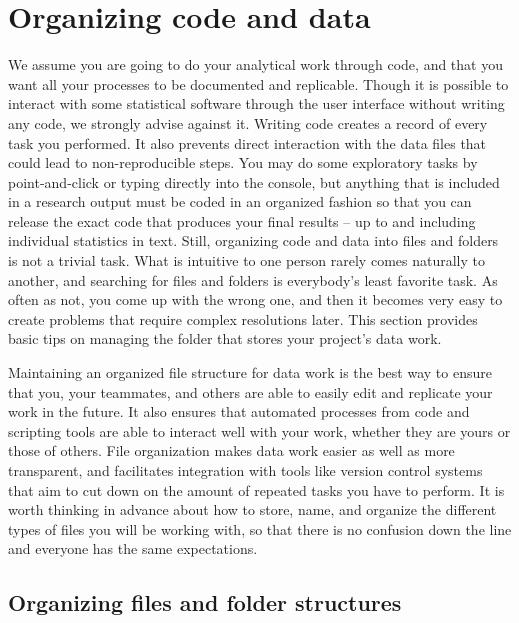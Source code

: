 \section{Organizing code and data}

We assume you are going to do your analytical work through code,
and that you want all your processes to be documented and replicable.
Though it is possible to interact with some statistical software
through the user interface without writing any code,
we strongly advise against it.
Writing code creates a record of every task you performed.
It also prevents direct interaction with the data files that could lead to non-reproducible steps.
You may do some exploratory tasks by point-and-click or typing directly into the console,
but anything that is included in a research output
must be coded in an organized fashion so that you can release
the exact code that produces your final results --
up to and including individual statistics in text.
Still, organizing code and data into files and folders is not a trivial task.
What is intuitive to one person rarely comes naturally to another,
and searching for files and folders is everybody's least favorite task.
As often as not, you come up with the wrong one,
and then it becomes very easy to create problems that require complex resolutions later.
This section provides basic tips on managing the folder
that stores your project's data work.

Maintaining an organized file structure for data work is the best way
to ensure that you, your teammates, and others
are able to easily edit and replicate your work in the future.
It also ensures that automated processes from code and scripting tools
are able to interact well with your work,
whether they are yours or those of others.
File organization makes data work easier as well as more transparent,
and facilitates integration with tools like version control systems
that aim to cut down on the amount of repeated tasks you have to perform.
It is worth thinking in advance about how to store, name, and organize
the different types of files you will be working with,
so that there is no confusion down the line
and everyone has the same expectations.

\subsection{Organizing files and folder structures}

